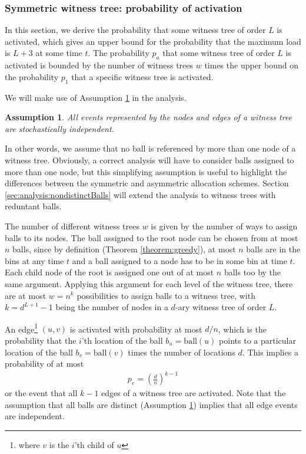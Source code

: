 \documentclass[a4paper,12pt]{article}
\newtheorem{assumption}{Assumption}
\begin{document}
\subsubsection{Symmetric witness tree: probability of activation}
\label{sec:probabilitySymWT}
In this section, we derive the probability that some witness tree of order $L$ is activated, which gives an upper bound for the probability that the maximum load is $L+3$ at some time $t$. The probability $p_a$ that some witness tree of order $L$ is activated is bounded by the number of witness trees $w$ times the upper bound on the probability $p_1$ that a specific witness tree is activated.

We will make use of Assumption \ref{assumption:independence} in the analysis. 
\begin{assumption}
\label{assumption:independence}
All events represented by the nodes and edges of a witness tree are stochastically independent. 
\end{assumption}
In other words, we assume that no ball is referenced by more than one node of a witness tree. Obviously, a correct analysis will have to consider balls assigned to more than one node, but this simplifying assumption is useful to highlight the differences between the symmetric and asymmetric allocation schemes. Section \ref{sec:analysis:nondistinctBalls} will extend the analysis to witness trees with reduntant balls.

The number of different witness trees $w$ is given by the number of ways to assign balls to its nodes. The ball assigned to the root node can be chosen from at most $n$ balls, since by definition (Theorem \ref{theorem:greedy}), at most $n$ balls are in the bins at any time $t$ and a ball assigned to a node has to be in some bin at time $t$. Each child node of the root is assigned one out of at most $n$ balls too by the same argument. Applying this argument for each level of the witness tree, there are at most $w = n^k$ possibilities to assign balls to a witness tree, with $k = d^{L+1}-1$ being the number of nodes in a $d$-ary witness tree of order $L$.
 
An edge\footnote{where $v$ is the $i$'th child of $u$} $(u, v)$ is activated with probability at most $d/n$, which is the probability that the $i$'th location of the ball $b_u = \mathrm{ball}(u)$ points to a particular location of the ball $b_v = \mathrm{ball}(v)$ times the number of locations $d$. This implies a probability of at most
\begin{align}
p_e = \left(\frac{d}{n}\right)^{k-1}
\end{align} 
or the event that all $k-1$ edges of a witness tree are activated. Note that  the assumption that all balls are distinct (Assumption \ref{assumption:independence}) implies that all edge events are independent.
\end{document}
